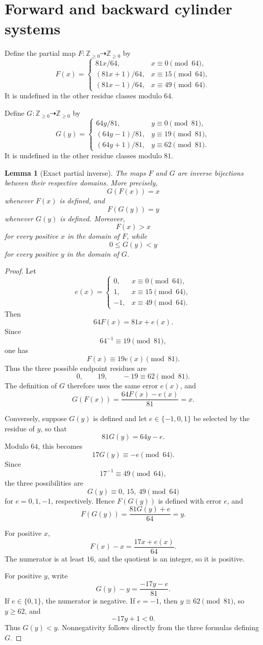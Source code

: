 \documentclass[11pt]{article}
\newtheorem{lemma}[theorem]{Lemma}
\theoremstyle{remark}
\newcommand{\Z}{\mathbb{Z}}
\begin{document}
\section{Forward and backward cylinder systems}

Define the partial map \(F:\Z_{\ge0}\dashrightarrow\Z_{\ge0}\) by
\[
F(x)=
\begin{cases}
81x/64,&x\equiv0\pmod{64},\\
(81x+1)/64,&x\equiv15\pmod{64},\\
(81x-1)/64,&x\equiv49\pmod{64}.
\end{cases}
\]
It is undefined in the other residue classes modulo \(64\).

Define \(G:\Z_{\ge0}\dashrightarrow\Z_{\ge0}\) by
\[
G(y)=
\begin{cases}
64y/81,&y\equiv0\pmod{81},\\
(64y-1)/81,&y\equiv19\pmod{81},\\
(64y+1)/81,&y\equiv62\pmod{81}.
\end{cases}
\]
It is undefined in the other residue classes modulo \(81\).

\begin{lemma}[Exact partial inverse]
\label{lem:inverse}
The maps \(F\) and \(G\) are inverse bijections between their respective domains.  More precisely,
\[
G(F(x))=x
\]
whenever \(F(x)\) is defined, and
\[
F(G(y))=y
\]
whenever \(G(y)\) is defined.  Moreover,
\[
F(x)>x
\]
for every positive \(x\) in the domain of \(F\), while
\[
0\le G(y)<y
\]
for every positive \(y\) in the domain of \(G\).
\end{lemma}

\begin{proof}
Let
\[
e(x)=
\begin{cases}
0,&x\equiv0\pmod{64},\\
1,&x\equiv15\pmod{64},\\
-1,&x\equiv49\pmod{64}.
\end{cases}
\]
Then
\[
64F(x)=81x+e(x).
\]
Since
\[
64^{-1}\equiv19\pmod{81},
\]
one has
\[
F(x)\equiv19e(x)\pmod{81}.
\]
Thus the three possible endpoint residues are
\[
0,\qquad 19,\qquad -19\equiv62\pmod{81}.
\]
The definition of \(G\) therefore uses the same error \(e(x)\), and
\[
G(F(x))
=
\frac{64F(x)-e(x)}{81}
=
x.
\]

Conversely, suppose \(G(y)\) is defined and let \(e\in\{-1,0,1\}\) be selected by the residue of \(y\), so that
\[
81G(y)=64y-e.
\]
Modulo \(64\), this becomes
\[
17G(y)\equiv-e\pmod{64}.
\]
Since
\[
17^{-1}\equiv49\pmod{64},
\]
the three possibilities are
\[
G(y)\equiv0,\ 15,\ 49\pmod{64}
\]
for \(e=0,1,-1\), respectively.  Hence \(F(G(y))\) is defined with error \(e\), and
\[
F(G(y))
=
\frac{81G(y)+e}{64}
=
y.
\]

For positive \(x\),
\[
F(x)-x=\frac{17x+e(x)}{64}.
\]
The numerator is at least \(16\), and the quotient is an integer, so it is positive.

For positive \(y\), write
\[
G(y)-y=\frac{-17y-e}{81}.
\]
If \(e\in\{0,1\}\), the numerator is negative.  If \(e=-1\), then \(y\equiv62\pmod{81}\), so \(y\ge62\), and
\[
-17y+1<0.
\]
Thus \(G(y)<y\).  Nonnegativity follows directly from the three formulas defining \(G\).
\end{proof}
\end{document}
